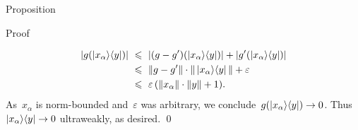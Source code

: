 \begin{parsec}
\begin{point}{Proposition}
\begin{point}{Proof}
\begin{point}
\begin{align*}
        | g(\left|x_\alpha\right>\!\left<y\right|) |
            &\ \leqslant\  | (g-g')(\left|x_\alpha\right>\!\left<y\right|)|  +
                    | g'(\left|x_\alpha\right>\!\left<y\right|) | \\
            &\ \leqslant\  \|g - g'\| \cdot \| \left|x_\alpha\right>\!\left<y\right| \|  + \varepsilon\\
            &\ \leqslant\  \varepsilon \,(\| x_\alpha\| \cdot \|y\| + 1).
\end{align*}
As~$x_\alpha$ is norm-bounded
    and~$\varepsilon$ was arbitrary,
        we conclude~$g(\left|x_\alpha\right>\!\left<y\right|) \to 0$.
    Thus~$\left|x_\alpha\right>\!\left<y\right| \to 0$ ultraweakly, as desired.
    \qed
\end{point}
\end{point}
\end{point}
\end{parsec}

